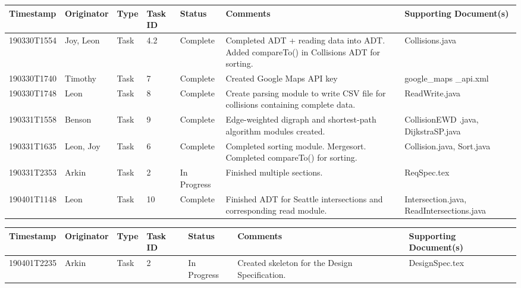 \documentclass[12pt]{article}
\begin{document}
\begin{center}
    \begin{tabular}{| P{2.5cm} | P{2.2cm} | P{1.4cm} | P{0.9cm} | P{1.9cm} | P{2.8cm} | P{3cm} |}
        \hline
        \textbf{Timestamp} & \textbf{Originator} & \textbf{Type} 
        & \textbf{Task ID} & \textbf{Status} & \textbf{Comments} 
        & \textbf{Supporting Document(s)}\\
        \hline
        190330T1554 & Joy, Leon & Task & 4.2 & Complete & Completed ADT + reading data into ADT. Added compareTo() in Collisions ADT for sorting. & Collisions.java \\
        \hline
        190330T1740 & Timothy & Task & 7 & Complete & Created Google Maps API key & google\_maps \_api.xml\\
        \hline
        190330T1748 & Leon & Task & 8 & Complete & Create parsing module to write CSV file for collisions containing complete data. & ReadWrite.java\\
        \hline
        190331T1558 & Benson & Task & 9 & Complete & Edge-weighted digraph and shortest-path algorithm modules created. & CollisionEWD
        .java, DijkstraSP.java\\
        \hline
        190331T1635 & Leon, Joy & Task & 6 & Complete & Completed sorting module. Mergesort. Completed compareTo() for sorting. & Collision.java, 
        Sort.java\\
        \hline
        190331T2353 & Arkin & Task & 2 & In Progress & Finished multiple sections. & ReqSpec.tex\\
        \hline
        190401T1148 & Leon & Task & 10 & Complete & Finished ADT for Seattle intersections and corresponding read module. & Intersection.java, ReadIntersections.java\\
        \hline
    \end{tabular}
    
    \begin{tabular}{| P{2.5cm} | P{2.2cm} | P{1.4cm} | P{0.9cm} | P{1.9cm} | P{2.8cm} | P{3cm} |}
        \hline
        \textbf{Timestamp} & \textbf{Originator} & \textbf{Type} 
        & \textbf{Task ID} & \textbf{Status} & \textbf{Comments} 
        & \textbf{Supporting Document(s)}\\
        \hline
        190401T2235 & Arkin & Task & 2 & In Progress & Created skeleton for the Design Specification. & DesignSpec.tex \\
        \hline
    \end{tabular}
    \end{center}
\end{document}
